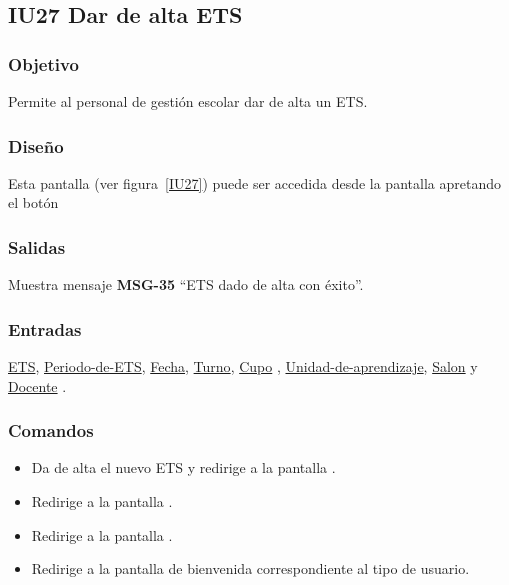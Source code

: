 
\subsection{IU27 Dar de alta ETS}
\subsubsection{Objetivo}
    Permite al personal de gestión escolar dar de alta un ETS.
\subsubsection{Diseño}
    Esta pantalla  (ver figura~\ref{IU27}) puede ser accedida desde la pantalla  apretando el botón 

\subsubsection{Salidas}
Muestra mensaje {\bf MSG-35} ``ETS  dado de alta con éxito''.
\subsubsection{Entradas}
\hyperlink{ETS.ETS }{ETS},  \hyperlink{ETS.Periodo-de-ETS }{ Periodo-de-ETS},  \hyperlink{ETS.Fecha}{Fecha},  \hyperlink{ETS.Turno}{Turno},  \hyperlink{ETS.Cupo} {Cupo} ,  \hyperlink{ETS.Unidad-de-aprendizaje }{Unidad-de-aprendizaje},  \hyperlink{ETS.Salon}{Salon} y \hyperlink{ETS.Docente}{Docente} .
\subsubsection{Comandos}
\begin{itemize}
    \item {} Da de alta el nuevo ETS y redirige a la pantalla .
    \item {} Redirige a la pantalla .
    \item {} Redirige a la pantalla .
    \item {} Redirige a la pantalla de bienvenida correspondiente al tipo de usuario.
    
\end{itemize}

